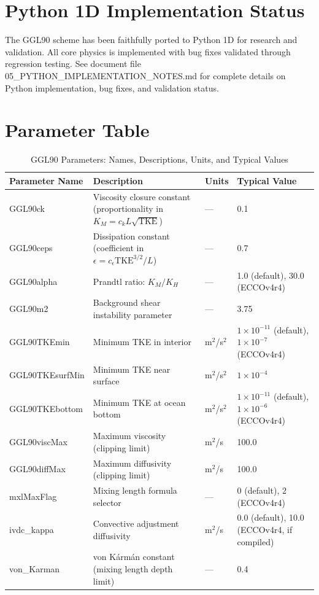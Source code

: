 \documentclass[11pt, a4paper]{article}
\begin{document}
\section{Python 1D Implementation Status}

The GGL90 scheme has been faithfully ported to Python 1D for research and validation. All core physics is implemented with bug fixes validated through regression testing. See document file 05\_PYTHON\_IMPLEMENTATION\_NOTES.md for complete details on Python implementation, bug fixes, and validation status.

\appendix

\section{Parameter Table}

\begin{longtable}{lp{6cm}ll}
\caption{GGL90 Parameters: Names, Descriptions, Units, and Typical Values} \\
\toprule
\textbf{Parameter Name} & \textbf{Description} & \textbf{Units} & \textbf{Typical Value} \\
\midrule
\endhead
\bottomrule
\endfoot

GGL90ck & Viscosity closure constant (proportionality in $K_M = c_k L\sqrt{\text{TKE}}$) & — & 0.1 \\
GGL90ceps & Dissipation constant (coefficient in $\epsilon = c_\epsilon \text{TKE}^{3/2}/L$) & — & 0.7 \\
GGL90alpha & Prandtl ratio: $K_M/K_H$ & — & 1.0 (default), 30.0 (ECCOv4r4) \\
GGL90m2 & Background shear instability parameter & — & 3.75 \\
\midrule
GGL90TKEmin & Minimum TKE in interior & m$^2$/s$^2$ & $1 \times 10^{-11}$ (default), $1 \times 10^{-7}$ (ECCOv4r4) \\
GGL90TKEsurfMin & Minimum TKE near surface & m$^2$/s$^2$ & $1 \times 10^{-4}$ \\
GGL90TKEbottom & Minimum TKE at ocean bottom & m$^2$/s$^2$ & $1 \times 10^{-11}$ (default), $1 \times 10^{-6}$ (ECCOv4r4) \\
\midrule
GGL90viscMax & Maximum viscosity (clipping limit) & m$^2$/s & 100.0 \\
GGL90diffMax & Maximum diffusivity (clipping limit) & m$^2$/s & 100.0 \\
\midrule
mxlMaxFlag & Mixing length formula selector & — & 0 (default), 2 (ECCOv4r4) \\
\midrule
ivdc\_kappa & Convective adjustment diffusivity & m$^2$/s & 0.0 (default), 10.0 (ECCOv4r4, if compiled) \\
\midrule
von\_Karman & von Kármán constant (mixing length depth limit) & — & 0.4 \\

\end{longtable}
\end{document}

